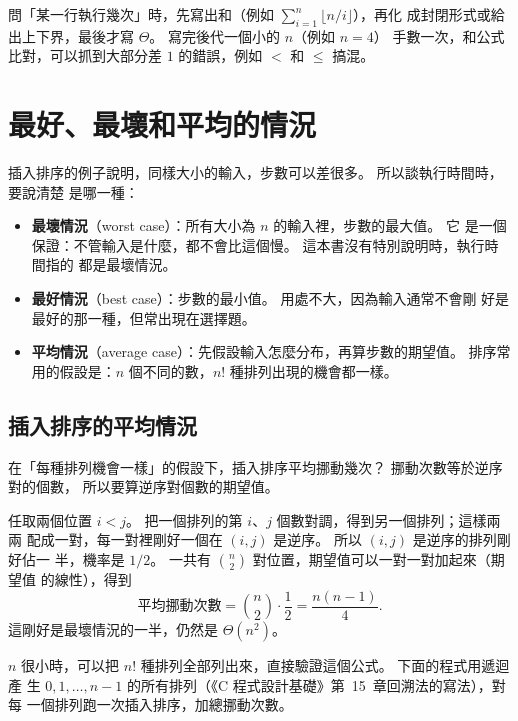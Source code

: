 \begin{examnote}
問「某一行執行幾次」時，先寫出和（例如 $\sum_{i=1}^{n} \lfloor n/i \rfloor$），再化
成封閉形式或給出上下界，最後才寫 $\Theta$。 寫完後代一個小的 $n$（例如 $n = 4$）
手數一次，和公式比對，可以抓到大部分差 $1$ 的錯誤，例如 $<$ 和 $\le$ 搞混。
\end{examnote}

\section{最好、最壞和平均的情況}
\label{sec:ana-cases}

插入排序的例子說明，同樣大小的輸入，步數可以差很多。 所以談執行時間時，要說清楚
是哪一種：

\begin{itemize}
\item \textbf{最壞情況}（worst case）：所有大小為 $n$ 的輸入裡，步數的最大值。 它
是一個保證：不管輸入是什麼，都不會比這個慢。 這本書沒有特別說明時，執行時間指的
都是最壞情況。
\item \textbf{最好情況}（best case）：步數的最小值。 用處不大，因為輸入通常不會剛
好是最好的那一種，但常出現在選擇題。
\item \textbf{平均情況}（average case）：先假設輸入怎麼分布，再算步數的期望值。
排序常用的假設是：$n$ 個不同的數，$n!$ 種排列出現的機會都一樣。
\end{itemize}

\subsection{插入排序的平均情況}

在「每種排列機會一樣」的假設下，插入排序平均挪動幾次？ 挪動次數等於逆序對的個數，
所以要算逆序對個數的期望值。

任取兩個位置 $i < j$。 把一個排列的第 $i$、$j$ 個數對調，得到另一個排列；這樣兩兩
配成一對，每一對裡剛好一個在 $(i, j)$ 是逆序。 所以 $(i, j)$ 是逆序的排列剛好佔一
半，機率是 $1/2$。 一共有 $\binom{n}{2}$ 對位置，期望值可以一對一對加起來（期望值
的線性），得到
\[
\text{平均挪動次數} = \binom{n}{2} \cdot \frac{1}{2} = \frac{n(n-1)}{4}.
\]
這剛好是最壞情況的一半，仍然是 $\Theta(n^2)$。

$n$ 很小時，可以把 $n!$ 種排列全部列出來，直接驗證這個公式。 下面的程式用遞迴產
生 $0, 1, \ldots, n-1$ 的所有排列（《C 程式設計基礎》第~15~章回溯法的寫法），對每
一個排列跑一次插入排序，加總挪動次數。

